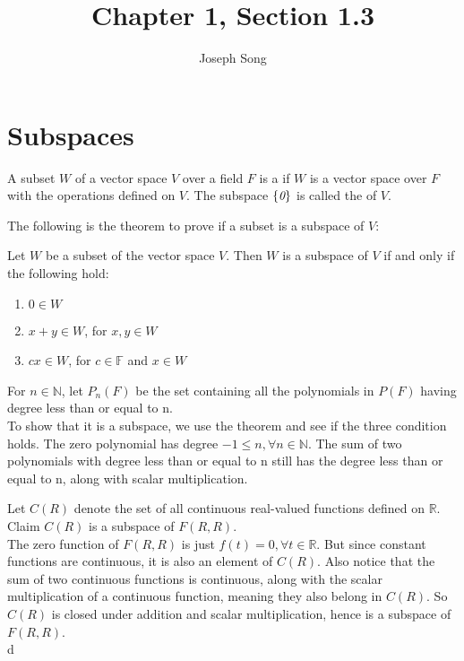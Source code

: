 \documentclass{article}
\title{Chapter 1, Section 1.3}
\author{Joseph Song}
\date{}
\begin{document}
 
 \maketitle
 
 \section{Subspaces}
 
 \begin{definition}[Subspace]
 A subset $W$ of a vector space $V$ over a field $F$ is a  if $W$ is a vector space over $F$ with the operations defined on $V$. The subspace $\{ \emph{0} \}$ is called the  of $V$.
 \end{definition}
 
 The following is the theorem to prove if a subset is a subspace of $V$:
 \begin{theorem}
     Let $W$ be a subset of the vector space $V$. Then $W$ is a subspace of $V$ if and only if the following hold:
 \end{theorem}
 \begin{enumerate}[label=(\arabic*)]
     \item $0 \in W$
     \item $x + y \in W$, for $x, y \in W$
     \item $cx \in W$, for $c \in \mathbb{F}$ and $x \in W$
 \end{enumerate}
 \begin{example}[Polynomials]
 \end{example}
 For $n \in \mathbb{N}$, let $P_n(F)$ be the set containing all the polynomials in $P(F)$ having degree less than or equal to n.
 \\
 To show that it is a subspace, we use the theorem and see if the three condition holds. The zero polynomial has degree $-1 \leq n, \forall n \in \mathbb{N}$.
 The sum of two polynomials with degree less than or equal to n still has the degree less than or equal to n, along with scalar multiplication.
 
 \begin{example}[Functions]
 \end{example}
 
 Let $C(R)$ denote the set of all continuous real-valued functions defined on $\mathbb{R}$. Claim $C(R)$ is a subspace of $F(R, R)$.
 \\
 The zero function of $F(R,R)$ is just $f(t) = 0, \forall t\in \mathbb{R}$. But since constant functions are continuous, it is also an element of $C(R)$. Also notice that the sum of two continuous functions is continuous, along with the scalar multiplication of a continuous function, meaning they also belong in $C(R)$. So $C(R)$ is closed under addition and scalar multiplication, hence is a subspace of $F(R,R)$.
 \\
d
 
\end{document}

